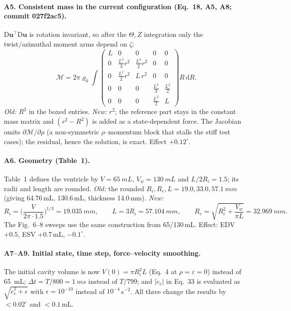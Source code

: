 \documentclass[10pt]{article}
\begin{document}
\paragraph{A5. Consistent mass in the current configuration (Eq.~18, A5, A8; commit 027f2ac5).}
$\mathrm D\boldsymbol u^\top\mathrm D\boldsymbol u$ is rotation invariant, so after the $\Theta,Z$
integration only the twist/azimuthal moment arms depend on $\zeta$:
\begin{equation*}
\mathcal M=2\pi\varrho_0\!\int\!\begin{pmatrix}
L&0&0&0&0\\ 0&\tfrac{L^3}{3}\boxed{r^2}&\tfrac{L^2}{2}\boxed{r^2}&0&0\\
0&\tfrac{L^2}{2}\boxed{r^2}&L\,\boxed{r^2}&0&0\\ 0&0&0&\tfrac{L^3}{3}&\tfrac{L^2}{2}\\
0&0&0&\tfrac{L^2}{2}&L\end{pmatrix}R\,\mathrm dR .
\end{equation*}
\emph{Old:} $R^2$ in the boxed entries. \emph{New:} $r^2$; the reference part stays in the
constant mass matrix and $(r^2-R^2)$ is added as a state-dependent force. The Jacobian omits
$\partial\mathcal M/\partial\rho$ (a non-symmetric $\rho$--momentum block that stalls the stiff
test cases); the residual, hence the solution, is exact. Effect $+0.12^\circ$.

\paragraph{A6. Geometry (Table~1).} Table~1 defines the ventricle by $V=\SI{65}{mL}$,
$V_w=\SI{130}{mL}$ and $L/2R_i=1.5$; its radii and length are rounded. \emph{Old:} the rounded
$R_i,R_e,L=19.0,33.0,\SI{57.1}{mm}$ (giving 64.76\,mL, 130.6\,mL, thickness 14.0\,mm).
\emph{New:}
\begin{equation*}
R_i=\Big(\frac{V}{2\pi\cdot1.5}\Big)^{1/3}=\SI{19.035}{mm},\qquad L=3R_i=\SI{57.104}{mm},\qquad
R_e=\sqrt{R_i^2+\frac{V_w}{\pi L}}=\SI{32.969}{mm}.
\end{equation*}
The Fig.~6--8 sweeps use the same construction from 65/130\,mL. Effect: EDV $+0.5$, ESV
$+0.7$\,mL, $-0.1^\circ$.

\paragraph{A7--A9. Initial state, time step, force--velocity smoothing.} The initial cavity
volume is now $V(0)=\pi R_i^2L$ (Eq.~4 at $\rho=\varepsilon=0$) instead of \SI{65}{mL};
$\Delta t=T/800=\SI{1}{ms}$ instead of $T/799$; and $|\dot e_c|$ in Eq.~33 is evaluated as
$\sqrt{\dot e_c^2+\epsilon}$ with $\epsilon=10^{-10}$ instead of $10^{-4}\,$s$^{-2}$. All three
change the results by $<0.02^\circ$ and $<0.1$\,mL.
\end{document}
